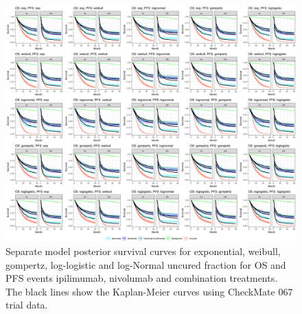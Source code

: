 \documentclass[AMA,STIX1COL]{WileyNJD-v2}
\begin{document}

\begin{figure}
\centering
\includegraphics[width=0.9\linewidth]{plot_S_grid_cf_separate.png}
\caption{\label{fig:S_grid_separate} Separate model posterior survival curves for exponential, weibull, gompertz, log-logistic and log-Normal uncured fraction for OS and PFS events ipilimumab, nivolumab and combination treatments. The black lines show the Kaplan-Meier curves using CheckMate 067 trial data.}
\end{figure}

\end{document}
